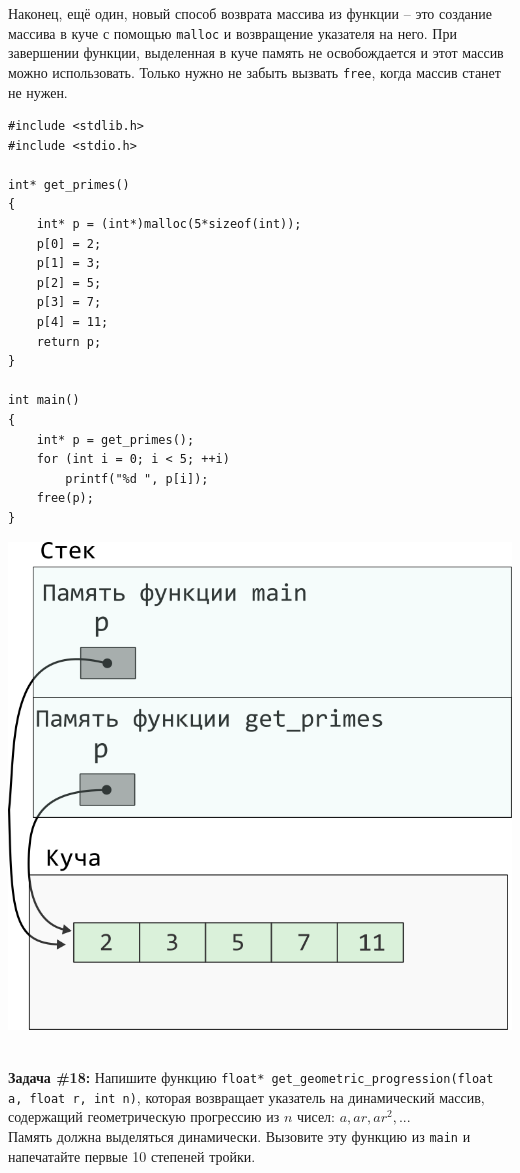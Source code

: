 \documentclass{article}
\begin{document}
Наконец, ещё один, новый способ возврата массива из функции -- это создание
массива в куче с помощью \texttt{malloc} и возвращение указателя на него.
При завершении функции, выделенная в куче память не освобождается и этот массив
можно использовать. Только нужно не забыть вызвать \texttt{free}, когда 
массив станет не нужен.
\begin{multicols}{2}
\begin{lstlisting}
#include <stdlib.h>
#include <stdio.h>

int* get_primes()
{
	int* p = (int*)malloc(5*sizeof(int));
	p[0] = 2;
	p[1] = 3;
	p[2] = 5;
	p[3] = 7;
	p[4] = 11;
	return p;
}

int main()
{
	int* p = get_primes();
	for (int i = 0; i < 5; ++i)
		printf("%d ", p[i]);
	free(p);
}
\end{lstlisting}
\columnbreak
\begin{center}
\includegraphics[scale=1]{../images/pointer_schemes/function_return_heap_array.png}
\end{center}
\end{multicols}
\quad\\
\textbf{Задача \#18:} Напишите функцию \texttt{float* get\_geometric\_progression(float a, float r, int n)}, которая возвращает указатель на динамический массив, содержащий геометрическую прогрессию из $n$ чисел: 
$a, ar, ar^2, ...$\\
Память должна выделяться динамически. Вызовите эту функцию из \texttt{main} и напечатайте первые 10 степеней тройки.
\end{document}

